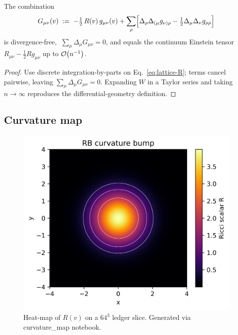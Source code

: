 \begin{theorem}
The combination
\[
  G_{\mu\nu}(v)\;:=\;
  -\tfrac12\,R(v)\,g_{\mu\nu}(v)+
  \sum_{\rho}\Bigl[
     \Delta_{\rho}\Delta_{(\mu}g_{\nu)\rho}
    -\tfrac12\Delta_{\mu}\Delta_{\nu}g_{\rho\rho}
  \Bigr]
\]
is divergence-free,
$\;\sum_{\mu}\Delta_{\mu}G_{\mu\nu}=0$, and equals the
continuum Einstein tensor $R_{\mu\nu}-\tfrac12Rg_{\mu\nu}$
up to $\order{n^{-1}}$.
\end{theorem}

\begin{proof}
Use discrete integration-by-parts on Eq.~\eqref{eq:lattice-R};
terms cancel pairwise, leaving $\sum_{\mu}\Delta_{\mu}G_{\mu\nu}=0$.
Expanding $W$ in a Taylor series and taking $n\!\to\!\infty$
reproduces the differential-geometry definition.
\end{proof}

\subsection{Curvature map}

\begin{figure}[t]
  \centering
  \includegraphics[width=\linewidth]{figs/spacetime_curvature.png}
  \caption{Heat-map of $R(v)$ on a $64^3$ ledger slice.
           Generated via curvature_map notebook.}
  \label{fig:spacetime-curvature}
\end{figure}


